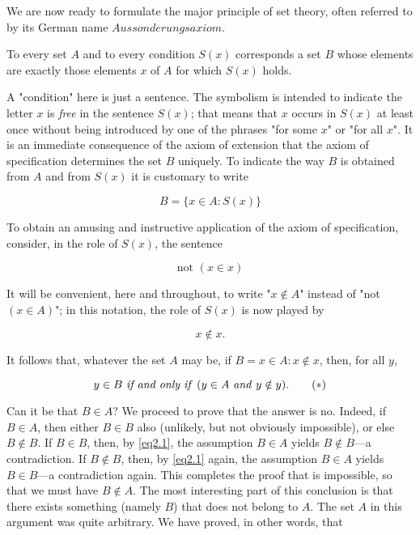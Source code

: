 We are now ready to formulate the major principle of set theory, often referred to by its German name $Aussonderungsaxiom$. 

\begin{named} To every set $A$ and to every condition $S(x)$ corresponds a set $B$ whose elements are exactly those elements $x$ of $A$ for which $S(x)$ holds.
\end{named}

A "condition" here is just a sentence. The symbolism is intended to indicate the letter $x$ is \textit{free} in the sentence $S(x)$; that means that $x$ occurs in $S(x)$ at least once without being introduced by one of the phrases "for some $x$" or "for all $x$". It is an immediate consequence of the axiom of extension that the axiom of specification determines the set $B$ uniquely. To indicate the way $B$ is obtained from $A$ and from $S(x)$ it is customary to write 

\begin{equation*}
B  = \{ x \in A: S(x) \} 
\end{equation*}

To obtain an amusing and instructive application of the axiom of specification, consider, in the role of $S(x)$, the sentence

\begin{equation*}
\text{not } (x \in x)
\end{equation*}

It will be convenient, here and throughout, to write "$x \notin  A$" instead of "not $(x \in A)$"; in this notation, the role of $S(x)$ is now played by

\begin{equation*}
x \notin x.
\end{equation*}

It follows that, whatever the set $A$ may be, if $B = {x \in A: x \notin x}$, then, for all $y$,

\begin{equation}
\label{eq2.1}
y \in B \text{ \textit{if and only if }} ( y \in A \text{ \textit{and} } y \notin y). \tag{$\ast$}
\end{equation}

Can it be that $B \in A$? We proceed to prove that the answer is no. Indeed, if $B \in A$, then either $B \in B$ also (unlikely, but not obviously impossible), or else $B \notin B$. If $B \in B$, then, by \eqref{eq2.1}, the assumption $B \in A$ yields $B \notin B$—a contradiction. If $B \notin B$, then, by \eqref{eq2.1} again, the assumption $B \in A$ yields $B \in B$—a contradiction again. This completes the proof that is impossible, so that we must have $B \notin A$. The most interesting part of this conclusion is that there exists something (namely $B$) that does not belong to $A$. The set $A$ in this argument was quite arbitrary. We have proved, in other words, that 

